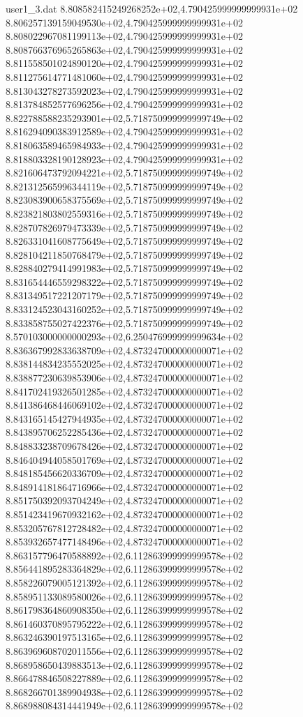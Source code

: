 \begin{filecontents}{user1_3.dat}
8.808582415249268252e+02,4.790425999999999931e+02
8.806257139159049530e+02,4.790425999999999931e+02
8.808022967081199113e+02,4.790425999999999931e+02
8.808766376965265863e+02,4.790425999999999931e+02
8.811558501024890120e+02,4.790425999999999931e+02
8.811275614771481060e+02,4.790425999999999931e+02
8.813043278273592023e+02,4.790425999999999931e+02
8.813784852577696256e+02,4.790425999999999931e+02
8.822788588235293901e+02,5.718750999999999749e+02
8.816294090383912589e+02,4.790425999999999931e+02
8.818063589465984933e+02,4.790425999999999931e+02
8.818803328190128923e+02,4.790425999999999931e+02
8.821606473792094221e+02,5.718750999999999749e+02
8.821312565996344119e+02,5.718750999999999749e+02
8.823083900658375569e+02,5.718750999999999749e+02
8.823821803802559316e+02,5.718750999999999749e+02
8.828707826979473339e+02,5.718750999999999749e+02
8.826331041608775649e+02,5.718750999999999749e+02
8.828104211850768479e+02,5.718750999999999749e+02
8.828840279414991983e+02,5.718750999999999749e+02
8.831654446559298322e+02,5.718750999999999749e+02
8.831349517221207179e+02,5.718750999999999749e+02
8.833124523043160252e+02,5.718750999999999749e+02
8.833858755027422376e+02,5.718750999999999749e+02
8.570103000000000293e+02,6.250476999999999634e+02
8.836367992833638709e+02,4.873247000000000071e+02
8.838144834235552025e+02,4.873247000000000071e+02
8.838877230639853906e+02,4.873247000000000071e+02
8.841702419326501285e+02,4.873247000000000071e+02
8.841386468446069102e+02,4.873247000000000071e+02
8.843165145427944935e+02,4.873247000000000071e+02
8.843895706252285436e+02,4.873247000000000071e+02
8.848833238709678426e+02,4.873247000000000071e+02
8.846404944058501769e+02,4.873247000000000071e+02
8.848185456620336709e+02,4.873247000000000071e+02
8.848914181864716966e+02,4.873247000000000071e+02
8.851750392093704249e+02,4.873247000000000071e+02
8.851423419670932162e+02,4.873247000000000071e+02
8.853205767812728482e+02,4.873247000000000071e+02
8.853932657477148496e+02,4.873247000000000071e+02
8.863157796470588892e+02,6.112863999999999578e+02
8.856441895283364829e+02,6.112863999999999578e+02
8.858226079005121392e+02,6.112863999999999578e+02
8.858951133089580026e+02,6.112863999999999578e+02
8.861798364860908350e+02,6.112863999999999578e+02
8.861460370895795222e+02,6.112863999999999578e+02
8.863246390197513165e+02,6.112863999999999578e+02
8.863969608702011556e+02,6.112863999999999578e+02
8.868958650439883513e+02,6.112863999999999578e+02
8.866478846508227889e+02,6.112863999999999578e+02
8.868266701389904938e+02,6.112863999999999578e+02
8.868988084314441949e+02,6.112863999999999578e+02

\end{filecontents}
